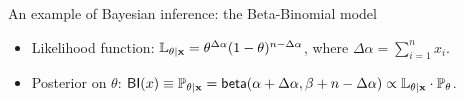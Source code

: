 \documentclass[final,hyperref={pdfpagelabels=false}]{beamer}
\begin{document}
\begin{frame}[t]
\begin{columns}[t]
\begin{column}{.485\textwidth}
\begin{block}{An example of Bayesian inference: the Beta-Binomial model}
\begin{itemize}
  \item  Likelihood function: {\small $\mathbb{L}_{\theta|\textbf{x} }= \theta^{\Delta \alpha}(1-\theta)^{n - \Delta \alpha}$, where $\Delta \alpha = \displaystyle\sum_{i=1}^{n}x_i$.}

  \item Posterior on {\small $\theta$: $\mathsf{BI}(x)\equiv\mathbb{P}_{\theta|\textbf{x}}=\mathsf{beta}(\alpha + \Delta \alpha,\beta + n - \Delta \alpha)\propto\mathbb{L}_{\theta|\textbf{x} }\cdot \mathbb{P}_{\theta}$.}
\end{itemize}
\end{block}



\end{column}
\end{columns}
\end{frame}
\end{document}
